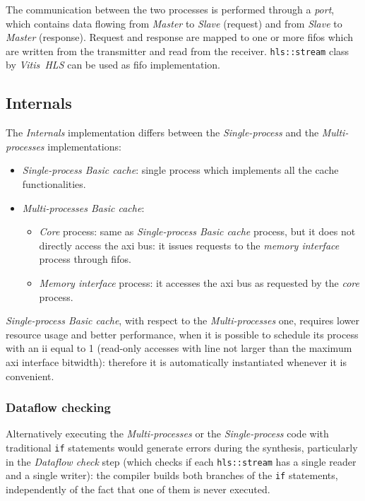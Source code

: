 \documentclass[11pt,a4paper,oneside]{memoir}
\begin{document}
The communication between the two processes is performed through a \emph{port},
which contains data flowing from \emph{Master} to \emph{Slave} (request) and
from \emph{Slave} to \emph{Master} (response).
Request and response are mapped to one or more \acp{fifo} which are written
from the transmitter and read from the receiver.
\texttt{hls::stream} class by \emph{Vitis\texttrademark~HLS} can be used as
\ac{fifo} implementation.

\subsection{Internals}\label{subsec:basic_impl_internals}
The \emph{Internals} implementation differs between the \emph{Single-process}
and the \emph{Multi-processes} implementations:
\begin{itemize}
	\item \emph{Single-process Basic cache}: single process which
		implements all the cache functionalities.
	\item \emph{Multi-processes Basic cache}:
		\begin{itemize}
			\item \emph{Core} process: same as \emph{Single-process
				Basic cache} process, but it does not
				directly access the \ac{axi} bus: it issues
				requests to the \emph{memory interface} process
				through \acp{fifo}.
			\item \emph{Memory interface} process: it accesses the
				\ac{axi} bus as requested by the \emph{core}
				process.
		\end{itemize}
\end{itemize}

\emph{Single-process Basic cache}, with respect to the \emph{Multi-processes}
one, requires lower resource usage and better performance, when it is possible
to schedule its process with an \ac{ii} equal to 1 (read-only accesses with
line not larger than the maximum \ac{axi} interface bitwidth): therefore it is
automatically instantiated whenever it is convenient.

\subsubsection{Dataflow checking}
Alternatively executing the \emph{Multi-processes} or the \emph{Single-process}
code with traditional \texttt{if} statements would generate errors during the
synthesis, particularly in the \emph{Dataflow check} step (which checks if each
\texttt{hls::stream} has a single reader and a single writer): the compiler
builds both branches of the \texttt{if} statements, independently of the fact
that one of them is never executed.
\end{document}
